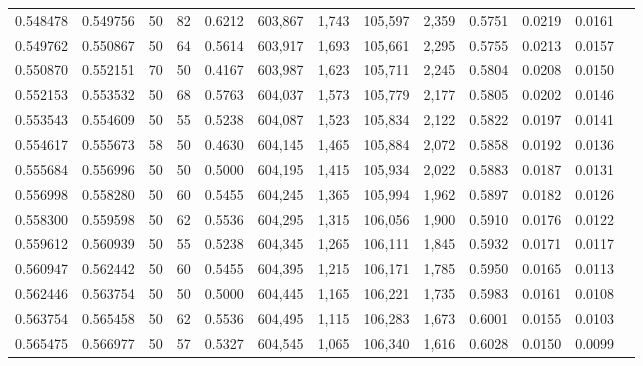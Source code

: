 \begin{tabular}{rrrrrrrrrrrrr}
0.548478 & 0.549756 &    50 &  82 &                                     0.6212 & 603,867 &   1,743 & 105,597 &   2,359 & 0.5751 & 0.0219 & 0.0161 \\
0.549762 & 0.550867 &    50 &  64 &                                     0.5614 & 603,917 &   1,693 & 105,661 &   2,295 & 0.5755 & 0.0213 & 0.0157 \\
0.550870 & 0.552151 &    70 &  50 &                                     0.4167 & 603,987 &   1,623 & 105,711 &   2,245 & 0.5804 & 0.0208 & 0.0150 \\
0.552153 & 0.553532 &    50 &  68 &                                     0.5763 & 604,037 &   1,573 & 105,779 &   2,177 & 0.5805 & 0.0202 & 0.0146 \\
0.553543 & 0.554609 &    50 &  55 &                                     0.5238 & 604,087 &   1,523 & 105,834 &   2,122 & 0.5822 & 0.0197 & 0.0141 \\
0.554617 & 0.555673 &    58 &  50 &                                     0.4630 & 604,145 &   1,465 & 105,884 &   2,072 & 0.5858 & 0.0192 & 0.0136 \\
0.555684 & 0.556996 &    50 &  50 &                                     0.5000 & 604,195 &   1,415 & 105,934 &   2,022 & 0.5883 & 0.0187 & 0.0131 \\
0.556998 & 0.558280 &    50 &  60 &                                     0.5455 & 604,245 &   1,365 & 105,994 &   1,962 & 0.5897 & 0.0182 & 0.0126 \\
0.558300 & 0.559598 &    50 &  62 &                                     0.5536 & 604,295 &   1,315 & 106,056 &   1,900 & 0.5910 & 0.0176 & 0.0122 \\
0.559612 & 0.560939 &    50 &  55 &                                     0.5238 & 604,345 &   1,265 & 106,111 &   1,845 & 0.5932 & 0.0171 & 0.0117 \\
0.560947 & 0.562442 &    50 &  60 &                                     0.5455 & 604,395 &   1,215 & 106,171 &   1,785 & 0.5950 & 0.0165 & 0.0113 \\
0.562446 & 0.563754 &    50 &  50 &                                     0.5000 & 604,445 &   1,165 & 106,221 &   1,735 & 0.5983 & 0.0161 & 0.0108 \\
0.563754 & 0.565458 &    50 &  62 &                                     0.5536 & 604,495 &   1,115 & 106,283 &   1,673 & 0.6001 & 0.0155 & 0.0103 \\
0.565475 & 0.566977 &    50 &  57 &                                     0.5327 & 604,545 &   1,065 & 106,340 &   1,616 & 0.6028 & 0.0150 & 0.0099 \\

\end{tabular}
